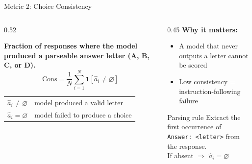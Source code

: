 \documentclass[aspectratio=169]{beamer}
\begin{document}
\begin{frame}{Metric 2: Choice Consistency}
\begin{columns}[T]
  \begin{column}{0.52\textwidth}
   
      \textbf{Fraction of responses where the model produced a
     parseable answer letter (A, B, C, or D). }  
    \vspace{0.3cm}
    \large
    \[
      \text{Cons} = \frac{1}{N}\sum_{i=1}^{N}\mathbf{1}\!\left[\hat{a}_i \neq \varnothing\right]
    \]
    \normalsize
    \vspace{0.3cm}
    \begin{tabular}{cl}
      $\hat{a}_i \neq \varnothing$ & model produced a valid letter\\
      $\hat{a}_i = \varnothing$ & model failed to produce a choice
    \end{tabular}
  \end{column}
  \begin{column}{0.45\textwidth}
    \textbf{Why it matters:}
    \begin{itemize}\itemsep5pt
     
      \item A model that never outputs a letter cannot be scored
      \item Low consistency = instruction-following failure
     
    \end{itemize}
    \vspace{0.3cm}
    \begin{alertblock}{Parsing rule}
      \small Extract the first occurrence of\\
      \texttt{Answer: <letter>} from the response.\\
      If absent $\Rightarrow$ $\hat{a}_i = \varnothing$
    \end{alertblock}
  \end{column}
\end{columns}
\end{frame}
\end{document}
